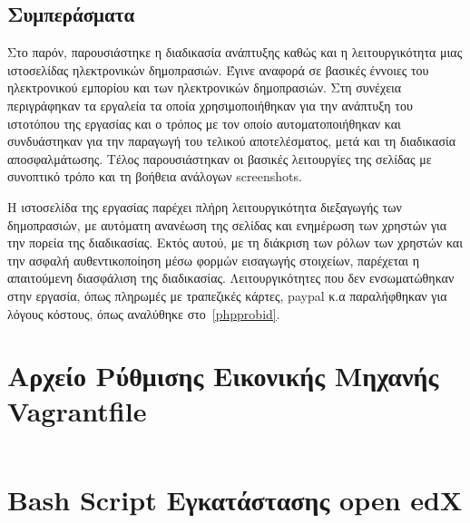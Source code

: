 \documentclass[12pt]{report}
\begin{document}
\section{Συμπεράσματα}
Στο παρόν, παρουσιάστηκε η διαδικασία ανάπτυξης καθώς και η λειτουργικότητα μιας ιστοσελίδας ηλεκτρονικών δημοπρασιών. Έγινε αναφορά σε βασικές έννοιες του ηλεκτρονικού εμπορίου και των ηλεκτρονικών δημοπρασιών. Στη συνέχεια περιγράφηκαν τα εργαλεία τα οποία χρησιμοποιήθηκαν για την ανάπτυξη του ιστοτόπου της εργασίας και ο τρόπος με τον οποίο αυτοματοποιήθηκαν και συνδυάστηκαν για την παραγωγή του τελικού αποτελέσματος, μετά και τη διαδικασία αποσφαλμάτωσης. Τέλος παρουσιάστηκαν οι βασικές λειτουργίες της σελίδας με συνοπτικό τρόπο και τη βοήθεια ανάλογων \textlatin{screenshots}.

Η ιστοσελίδα της εργασίας παρέχει πλήρη λειτουργικότητα διεξαγωγής των δημοπρασιών, με αυτόματη ανανέωση της σελίδας και ενημέρωση των χρηστών για την πορεία της διαδικασίας. Εκτός αυτού, με τη διάκριση των ρόλων των χρηστών και την ασφαλή αυθεντικοποίηση μέσω φορμών εισαγωγής στοιχείων, παρέχεται η απαιτούμενη διασφάλιση της διαδικασίας. Λειτουργικότητες που δεν ενσωματώθηκαν στην εργασία, όπως πληρωμές με τραπεζικές κάρτες, \textlatin{paypal} κ.α παραλήφθηκαν για λόγους κόστους, όπως αναλύθηκε στο~\ref{phpprobid}.

\begin{appendices}
\chapter{Αρχείο Ρύθμισης Εικονικής Μηχανής \textlatin{Vagrantfile}}\label{AppA}
\inputminted[linenos, fontsize=\scriptsize, breaklines, baselinestretch=1]{ruby}{sources/Vagrantfile}
\chapter{\textlatin{Bash Script} Εγκατάστασης \textlatin{open edX}}\label{AppB}
\inputminted[linenos, fontsize=\scriptsize, breaklines, baselinestretch=1]{bash}{sources/install_edx.sh}
\end{appendices}

\appendix



\end{document}

